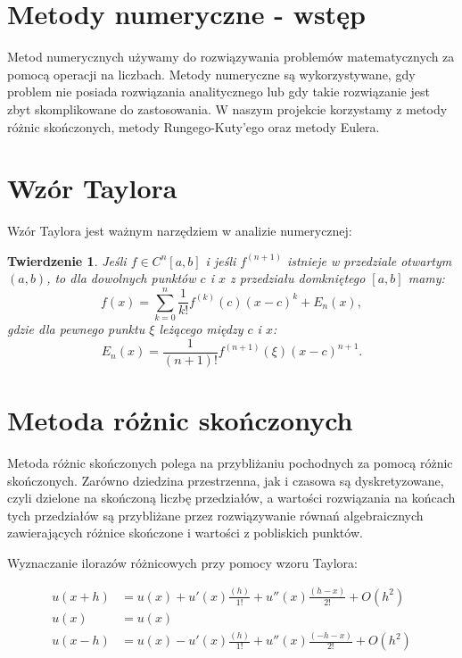 \documentclass[a4paper,12pt]{article}
\newtheorem{theorem}{Twierdzenie}
\begin{document}
	
	\section{Metody numeryczne - wstęp}
	Metod numerycznych używamy do rozwiązywania problemów matematycznych za pomocą operacji na liczbach. Metody numeryczne są wykorzystywane, gdy problem nie posiada rozwiązania analitycznego lub gdy takie rozwiązanie jest zbyt skomplikowane do zastosowania. W naszym projekcie korzystamy z metody różnic skończonych, metody Rungego-Kuty'ego oraz metody Eulera.
	
	\section{Wzór Taylora}
	Wzór Taylora jest ważnym narzędziem w analizie numerycznej:
	\begin{theorem}
		Jeśli $f \in C^n [a,b]$ i jeśli $f^{(n+1)}$ istnieje w przedziale otwartym $(a,b)$, to dla dowolnych punktów $c$ i $x$ z przedziału domkniętego $[a,b]$ mamy:
		\begin{equation}
			f(x)=\sum_{k=0}^n \frac{1}{k!}f^{(k)}(c)(x-c)^k + E_n (x),
		\end{equation}
		gdzie dla pewnego punktu $\xi$ leżącego między $c$ i $x$:
		\begin{equation}
			E_n (x) = \frac{1}{(n+1)!}f^{(n+1)}(\xi)(x-c)^{n+1}.
		\end{equation}
	\end{theorem}
	
	\section{Metoda różnic skończonych}
	Metoda różnic skończonych polega na przybliżaniu pochodnych za pomocą różnic skończonych. Zarówno dziedzina przestrzenna, jak i czasowa są dyskretyzowane, czyli dzielone na skończoną liczbę przedziałów, a wartości rozwiązania na końcach tych przedziałów są przybliżane przez rozwiązywanie równań algebraicznych zawierających różnice skończone i wartości z pobliskich punktów.
	
	Wyznaczanie ilorazów różnicowych przy pomocy wzoru Taylora:
	
	\begin{align*}
		u(x+h) &= u(x) + u'(x) \frac{(h)}{1!} + u''(x) \frac{(h-x)}{2!} + O(h^2) \\
		u(x) &= u(x) \\
		u(x-h) &= u(x) - u'(x) \frac{(h)}{1!} + u''(x) \frac{(-h-x)}{2!} + O(h^2)
	\end{align*}
	
\end{document}
